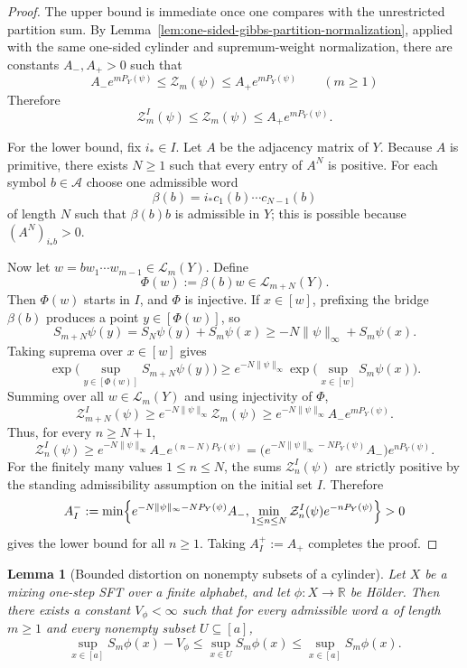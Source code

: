 \documentclass{etds}%
\numberwithin{equation}{section}
\theoremstyle{plain}
\newtheorem{lemma}[theorem]{Lemma}
\theoremstyle{definition}
\theoremstyle{remark}
\begin{document}
\begin{proof}
The upper bound is immediate once one compares with the unrestricted partition
sum.  By Lemma~\ref{lem:one-sided-gibbs-partition-normalization}, applied with
the same one-sided cylinder and supremum-weight normalization, there are
constants $A_-,A_+>0$ such that
\[
A_-e^{mP_Y(\psi)}
\le \mathcal{Z}_m(\psi)
\le A_+e^{mP_Y(\psi)}
\qquad(m\ge 1)
\]
Therefore
\[
\mathcal{Z}_m^I(\psi)\le \mathcal{Z}_m(\psi)\le A_+e^{mP_Y(\psi)}.
\]

For the lower bound, fix $i_\ast\in I$.  Let $A$ be the adjacency matrix of
$Y$.  Because $A$ is primitive, there exists $N\ge 1$ such that every entry of
$A^N$ is positive.  For each symbol $b\in\mathcal{A}$ choose one admissible
word
\[
\beta(b)=i_\ast c_1(b)\cdots c_{N-1}(b)
\]
of length $N$ such that $\beta(b)b$ is admissible in $Y$; this is possible
because $(A^N)_{i_\ast b}>0$.

Now let $w=bw_1\cdots w_{m-1}\in\mathcal{L}_m(Y)$.  Define
\[
\Phi(w):=\beta(b)w\in\mathcal{L}_{m+N}(Y).
\]
Then $\Phi(w)$ starts in $I$, and $\Phi$ is injective.  If $x\in[w]$, prefixing
the bridge $\beta(b)$ produces a point $y\in[\Phi(w)]$, so
\[
S_{m+N}\psi(y)=S_N\psi(y)+S_m\psi(x)\ge -N\|\psi\|_\infty+S_m\psi(x).
\]
Taking suprema over $x\in[w]$ gives
\[
\exp\!\bigl(\sup_{y\in[\Phi(w)]}S_{m+N}\psi(y)\bigr)
\ge
e^{-N\|\psi\|_\infty}
\exp\!\bigl(\sup_{x\in[w]}S_m\psi(x)\bigr).
\]
Summing over all $w\in\mathcal{L}_m(Y)$ and using injectivity of $\Phi$,
\[
\mathcal{Z}_{m+N}^I(\psi)
\ge e^{-N\|\psi\|_\infty}\mathcal{Z}_m(\psi)
\ge e^{-N\|\psi\|_\infty}A_-e^{mP_Y(\psi)}.
\]
Thus, for every $n\ge N+1$,
\[
\mathcal{Z}_n^I(\psi)
\ge e^{-N\|\psi\|_\infty}A_-e^{(n-N)P_Y(\psi)}
=\bigl(e^{-N\|\psi\|_\infty-NP_Y(\psi)}A_-\bigr)e^{nP_Y(\psi)}.
\]
For the finitely many values $1\le n\le N$, the sums $\mathcal{Z}_n^I(\psi)$
are strictly positive by the standing admissibility assumption on the initial
set $I$.  Therefore
\[
A_I^-:=\min\Bigl\{
e^{-N\|\psi\|_\infty-NP_Y(\psi)}A_-,
\min_{1\le n\le N}\mathcal{Z}_n^I(\psi)e^{-nP_Y(\psi)}
\Bigr\}>0
\]
gives the lower bound for all $n\ge 1$.  Taking $A_I^+:=A_+$ completes the
proof.
\end{proof}

\begin{lemma}[Bounded distortion on nonempty subsets of a cylinder]
\label{lem:subset-cylinder-distortion}
Let $X$ be a mixing one-step SFT over a finite alphabet, and let
$\phi:X\to\mathbb{R}$ be H\"older.  Then there exists a constant
$V_\phi<\infty$ such that for every admissible word $a$ of length $m\ge 1$ and
every nonempty subset $U\subseteq[a]$,
\[
\sup_{x\in[a]}S_m\phi(x)-V_\phi
\le \sup_{x\in U}S_m\phi(x)
\le \sup_{x\in[a]}S_m\phi(x).
\]
\end{lemma}
\end{document}
